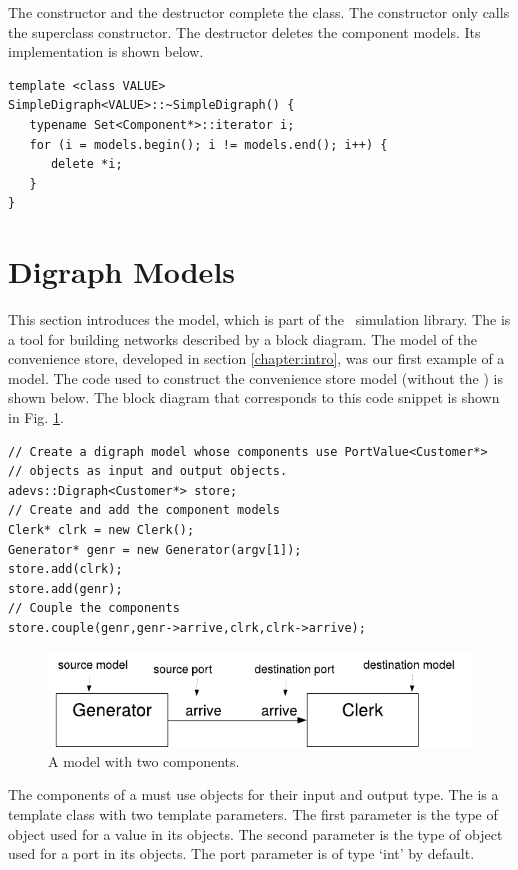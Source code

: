 The constructor and the destructor complete the class. The constructor only calls the superclass constructor. The destructor deletes the component models. Its implementation is shown below.
\begin{verbatim}
template <class VALUE>
SimpleDigraph<VALUE>::~SimpleDigraph() {
   typename Set<Component*>::iterator i;
   for (i = models.begin(); i != models.end(); i++) {
      delete *i;
   }
}
\end{verbatim}
 
\section{Digraph Models}
\label{section:digraph_models}
This section introduces the  model, which is part of the \adevs\ simulation library. The  is a tool for building networks described by a block diagram. The model of the convenience store, developed in section \ref{chapter:intro}, was our first example of a  model. The code used to construct the convenience store model (without the ) is shown below. The block diagram that corresponds to this code snippet is shown in Fig. \ref{fig:two_component_diagram}.
\begin{verbatim}
// Create a digraph model whose components use PortValue<Customer*>
// objects as input and output objects.
adevs::Digraph<Customer*> store;
// Create and add the component models
Clerk* clrk = new Clerk();
Generator* genr = new Generator(argv[1]);
store.add(clrk);
store.add(genr);
// Couple the components
store.couple(genr,genr->arrive,clrk,clrk->arrive);
\end{verbatim}
\begin{figure}[ht]
\centering
\includegraphics{network_models_figs/two_component_model.pdf}
\caption{A  model with two components.}
\label{fig:two_component_diagram}
\end{figure}

The components of a  must use  objects for their input and output type. The  is a template class with two template parameters. The first parameter is the type of object used for a value in its  objects. The second parameter is the type of object used for a port in its  objects. The port parameter is of type `int' by default.

